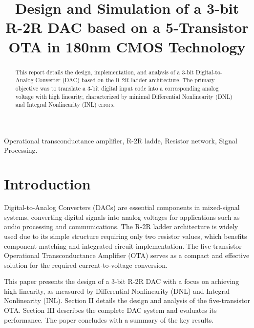 \documentclass[conference]{IEEEtran}
\begin{document}
\title{Design and Simulation of a 3-bit R-2R DAC based on a 5-Transistor OTA in 180nm CMOS Technology\\
}

\author{

}

\maketitle

\begin{abstract}
This report details the design, implementation, and analysis of a 3-bit Digital-to-Analog Converter (DAC) based on the R-2R ladder architecture. The primary objective was to translate a 3-bit digital input code into a corresponding analog voltage with high linearity, characterized by minimal Differential Nonlinearity (DNL) and Integral Nonlinearity (INL) errors.
\end{abstract}

\begin{IEEEkeywords}
Operational transconductance amplifier, R-2R ladde, Resistor network, Signal Processing.
\end{IEEEkeywords}

\section{Introduction}
Digital-to-Analog Converters (DACs) are essential components in mixed-signal systems, converting digital signals into analog voltages for applications such as audio processing and communications. The R-2R ladder architecture is widely used due to its simple structure requiring only two resistor values, which benefits component matching and integrated circuit implementation. The five-transistor Operational Transconductance Amplifier (OTA) serves as a compact and effective solution for the required current-to-voltage conversion.

This paper presents the design of a 3-bit R-2R DAC with a focus on achieving high linearity, as measured by Differential Nonlinearity (DNL) and Integral Nonlinearity (INL). Section II details the design and analysis of the five-transistor OTA. Section III describes the complete DAC system and evaluates its performance. The paper concludes with a summary of the key results.
\end{document}

